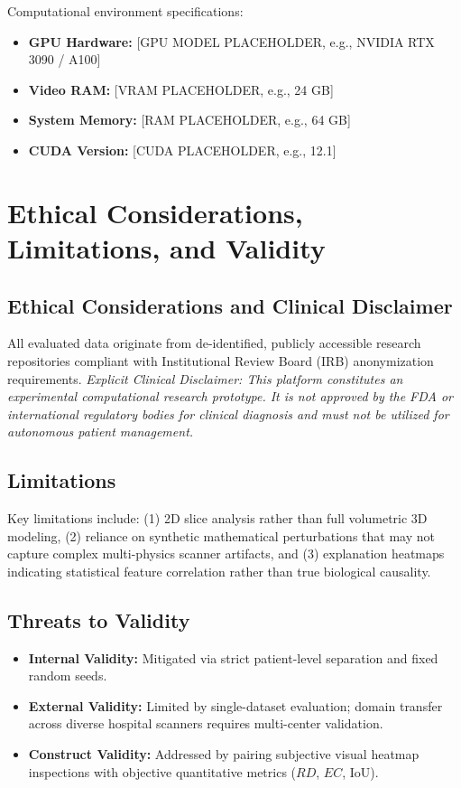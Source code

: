 \documentclass[conference]{IEEEtran}
\begin{document}
Computational environment specifications:
\begin{itemize}
    \item \textbf{GPU Hardware:} [GPU MODEL PLACEHOLDER, e.g., NVIDIA RTX 3090 / A100]
    \item \textbf{Video RAM:} [VRAM PLACEHOLDER, e.g., 24 GB]
    \item \textbf{System Memory:} [RAM PLACEHOLDER, e.g., 64 GB]
    \item \textbf{CUDA Version:} [CUDA PLACEHOLDER, e.g., 12.1]
\end{itemize}

\section{Ethical Considerations, Limitations, and Validity}
\label{sec:ethics_limitations}

\subsection{Ethical Considerations and Clinical Disclaimer}
All evaluated data originate from de-identified, publicly accessible research repositories compliant with Institutional Review Board (IRB) anonymization requirements. 
\textit{Explicit Clinical Disclaimer: This platform constitutes an experimental computational research prototype. It is not approved by the FDA or international regulatory bodies for clinical diagnosis and must not be utilized for autonomous patient management.}

\subsection{Limitations}
Key limitations include: (1) 2D slice analysis rather than full volumetric 3D modeling, (2) reliance on synthetic mathematical perturbations that may not capture complex multi-physics scanner artifacts, and (3) explanation heatmaps indicating statistical feature correlation rather than true biological causality.

\subsection{Threats to Validity}
\begin{itemize}
    \item \textbf{Internal Validity:} Mitigated via strict patient-level separation and fixed random seeds.
    \item \textbf{External Validity:} Limited by single-dataset evaluation; domain transfer across diverse hospital scanners requires multi-center validation.
    \item \textbf{Construct Validity:} Addressed by pairing subjective visual heatmap inspections with objective quantitative metrics ($RD$, $EC$, IoU).
\end{itemize}
\end{document}
